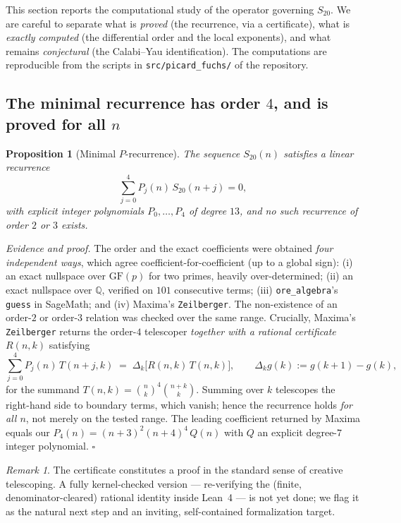 \documentclass[11pt,a4paper]{article}
\newtheorem{proposition}[theorem]{Proposition}
\theoremstyle{definition}
\theoremstyle{remark}
\newtheorem{remark}[theorem]{Remark}
\newcommand{\Sx}{S_{20}}
\begin{document}
This section reports the computational study of the operator governing $\Sx$.
We are careful to separate what is \emph{proved} (the recurrence, via a
certificate), what is \emph{exactly computed} (the differential order and the
local exponents), and what remains \emph{conjectural} (the Calabi--Yau
identification). The computations are reproducible from the scripts in
\texttt{src/picard\_fuchs/} of the repository.

\subsection{The minimal recurrence has order $4$, and is proved for all $n$}

\begin{proposition}[Minimal $P$-recurrence]\label{prop:rec4}
The sequence $\Sx(n)$ satisfies a linear recurrence
\[
  \sum_{j=0}^{4} P_j(n)\,\Sx(n+j) = 0,
\]
with explicit integer polynomials $P_0,\dots,P_4$ of degree $13$, and no such
recurrence of order $2$ or $3$ exists.
\end{proposition}

\noindent\emph{Evidence and proof.} The order and the exact coefficients were
obtained \emph{four independent ways}, which agree coefficient-for-coefficient
(up to a global sign): (i) an exact nullspace over $\mathrm{GF}(p)$ for two
primes, heavily over-determined; (ii) an exact nullspace over $\mathbb Q$,
verified on $101$ consecutive terms; (iii) \texttt{ore\_algebra}'s \texttt{guess}
in SageMath; and (iv) Maxima's \texttt{Zeilberger}. The non-existence of an
order-$2$ or order-$3$ relation was checked over the same range. Crucially,
Maxima's \texttt{Zeilberger} returns the order-$4$ telescoper \emph{together with
a rational certificate} $R(n,k)$ satisfying
\[
  \sum_{j=0}^{4} P_j(n)\,T(n+j,k) \;=\; \Delta_k\!\big[R(n,k)\,T(n,k)\big],
  \qquad \Delta_k g(k) := g(k+1)-g(k),
\]
for the summand $T(n,k)=\binom{n}{k}^4\binom{n+k}{k}$. Summing over $k$
telescopes the right-hand side to boundary terms, which vanish; hence the
recurrence holds \emph{for all $n$}, not merely on the tested range. The leading
coefficient returned by Maxima equals our $P_4(n)=(n+3)^2(n+4)^4\,Q(n)$ with
$Q$ an explicit degree-$7$ integer polynomial. \hfill$\square$

\begin{remark}
The certificate constitutes a proof in the standard sense of creative
telescoping. A fully kernel-checked version --- re-verifying the (finite,
denominator-cleared) rational identity inside Lean~4 --- is not yet done; we flag
it as the natural next step and an inviting, self-contained formalization target.
\end{remark}
\end{document}
